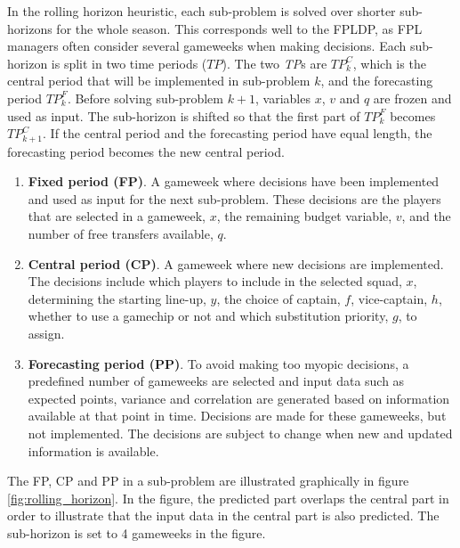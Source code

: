 \newpar

In the rolling horizon heuristic, each sub-problem is solved over shorter sub-horizons for the whole season. This corresponds well to the FPLDP, as FPL managers often consider several gameweeks when making decisions. Each sub-horizon is split in two time periods ($TP$). The two \textit{TP}s are $TP_k^{C}$, which is the central period that will be implemented in sub-problem $k$, and the forecasting period $TP_k^{F}$. Before solving sub-problem $k+1$, variables $x$, $v$ and $q$ are frozen and used as input. The sub-horizon is shifted so that the first part of $TP_k^{F}$ becomes $TP_{k+1}^{C}$. If the central period and the forecasting period have equal length, the forecasting period becomes the new central period. 

\begin{enumerate}[label=(\roman*)]
    \item \textbf{Fixed period (FP)}. A gameweek where decisions have been implemented and used as input for the next sub-problem. These decisions are the players that are selected in a gameweek, $x$, the remaining budget variable, $v$, and the number of free transfers available, $q$.
    \item \textbf{Central period (CP)}. A gameweek where new decisions are implemented. The decisions include which players to include in the selected squad, $x$, determining the starting line-up, $y$, the choice of captain, $f$,  vice-captain, $h$, whether to use a gamechip or not and which substitution priority, $g$, to assign.  
    \item \textbf{Forecasting period (PP)}. To avoid making too myopic decisions, a predefined number of gameweeks are selected and input data such as expected points, variance and correlation are generated based on information available at that point in time. Decisions are made for these gameweeks, but not implemented.  The decisions are subject to change when new and updated information is available. 
\end{enumerate}

The FP, CP and PP in a sub-problem are illustrated graphically in figure \ref{fig:rolling_horizon}. In the figure, the predicted part overlaps the central part in order to illustrate that the input data in the central part is also predicted. The sub-horizon is set to 4 gameweeks in the figure. 

